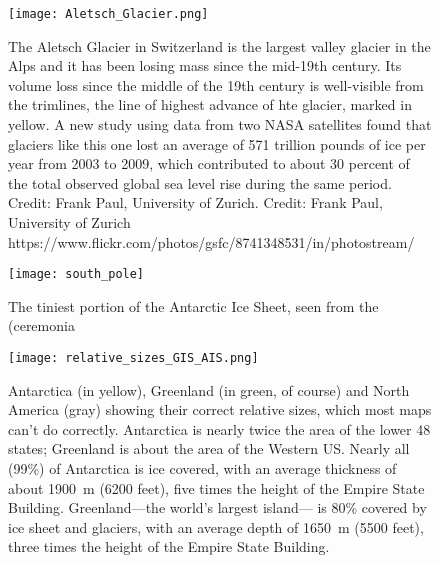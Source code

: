 \documentclass[amstex,12pt]{book}
\begin{document}
\begin{figure}[p]
	\centering
  \texttt{[image: Aletsch\_Glacier.png]}%
	\caption{The Aletsch Glacier in Switzerland is the largest valley glacier in the Alps and it has been losing mass since the mid-19th century. Its volume loss since the middle of the 19th century is well-visible from the trimlines, the line of highest advance of hte glacier, marked in yellow. A new study using data from two NASA satellites found that glaciers like this one lost an average of 571 trillion pounds of ice per year from 2003 to 2009, which contributed to about 30 percent of the total observed global sea level rise during the same period. Credit: Frank Paul, University of Zurich. Credit: Frank Paul, University of Zurich https://www.flickr.com/photos/gsfc/8741348531/in/photostream/}
	\label{fig:mtn_glacier}
\end{figure}

\begin{figure}[p]
	\centering
  \texttt{[image: south\_pole]}%
	\caption{The tiniest portion of the Antarctic Ice Sheet, seen from the (ceremonia }
	\label{fig:south_pole}
\end{figure}


\begin{figure}[p]
	\centering
  \texttt{[image: relative\_sizes\_GIS\_AIS.png]}%
	\caption{Antarctica (in yellow), Greenland (in green, of course) and North America (gray) showing their correct relative sizes, which most maps can't do correctly. Antarctica is nearly twice the area of the lower 48 states; Greenland is about the area of the Western US. Nearly all (99\%) of Antarctica is ice covered, with an average thickness of about \SI{1900}{\metre} (6200 feet), five times the height of the Empire State Building. Greenland---the world's largest island--- is 80\% covered by ice sheet and glaciers, with an average depth of \SI{1650}{\metre} (5500 feet), three times the height of the Empire State Building.}  
	\label{fig:rel_size}
\end{figure}
\end{document}

